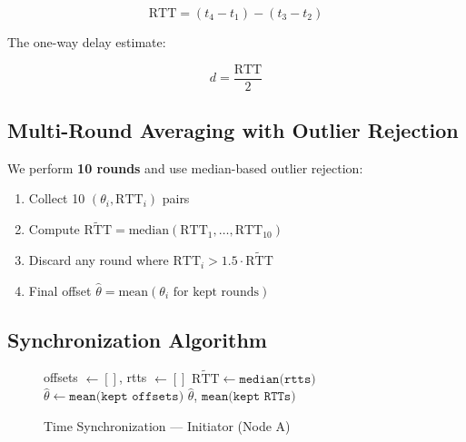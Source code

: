 \documentclass[11pt,a4paper]{article}
\begin{document}
\begin{equation}
\text{RTT} = (t_4 - t_1) - (t_3 - t_2)
\label{eq:rtt}
\end{equation}

The one-way delay estimate:

\begin{equation}
d = \frac{\text{RTT}}{2}
\label{eq:delay}
\end{equation}

\subsection{Multi-Round Averaging with Outlier Rejection}

We perform \textbf{10 rounds} and use median-based outlier rejection:

\begin{enumerate}
  \item Collect 10 $(\theta_i, \text{RTT}_i)$ pairs
  \item Compute $\tilde{\text{RTT}} = \text{median}(\text{RTT}_1, \ldots, \text{RTT}_{10})$
  \item Discard any round where $\text{RTT}_i > 1.5 \cdot \tilde{\text{RTT}}$
  \item Final offset $\hat{\theta} = \text{mean}(\theta_i \text{ for kept rounds})$
\end{enumerate}

\subsection{Synchronization Algorithm}

\begin{figure}[htbp]
\begin{algorithm}[H]
\SetAlgoLined
{}
offsets $\leftarrow []$, rtts $\leftarrow []$\;
$\tilde{\text{RTT}} \leftarrow \texttt{median(rtts)}$\;
$\hat{\theta} \leftarrow \texttt{mean(kept\ offsets)}$\;
\Return $\hat{\theta}$, $\texttt{mean(kept\ RTTs)}$\;
\caption{Time Synchronization --- Initiator (Node A)}
\label{alg:time-sync}
\end{algorithm}
\end{figure}
\end{document}
